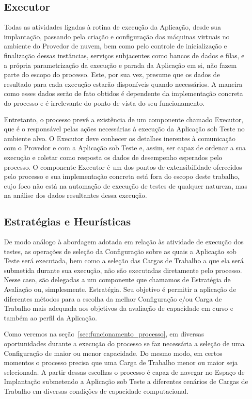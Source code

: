 \subsection{Executor}
Todas as atividades ligadas à rotina de execução da Aplicação, desde sua implantação,
passando pela criação e configuração das máquinas virtuais no ambiente do Provedor 
de nuvem, bem como pelo controle de inicialização e finalização dessas instâncias, 
serviços subjacentes como bancos de dados e filas, e a própria parametrização da 
execução e parada da Aplicação em si, não fazem parte do escopo do processo. Este,
por sua vez, presume que os dados de resultado para cada execução estarão disponíveis
quando necessários. A maneira como esses dados serão de fato obtidos é dependente
da implementação concreta do processo e é irrelevante do ponto de vista do seu 
funcionamento.  

Entretanto, o processo prevê a existência de um componente chamado Executor, que é 
o responsável pelas ações necessárias à execução da Aplicação sob Teste no ambiente
alvo. O Executor deve conhecer os detalhes inerentes à comunicação com o Provedor 
e com a Aplicação sob Teste e, assim, ser capaz de ordenar a sua execução e coletar
como resposta os dados de desempenho esperados pelo processo. O componente Executor
é um dos pontos de extensibilidade oferecidos pelo processo e sua implementação
concreta está fora do escopo deste trabalho, cujo foco não está na automação de
execução de testes de qualquer natureza, mas na análise dos dados resultantes dessa 
execução.

\subsection{Estratégias e Heurísticas}
\label{sec:heuristicas}
De modo análogo à abordagem adotada em relação às atividade de execução dos testes, 
as operações de seleção da Configuração sobre as quais a Aplicação
sob Teste será executada, bem como a seleção das Cargas de Trabalho a que ela 
será submetida durante sua execução, não são executadas diretamente pelo processo.
Nesse caso, são delegadas a um componente que chamamos de Estratégia de Avaliação ou, 
simplesmente, Estratégia. Seu objetivo é permitir a aplicação de diferentes métodos 
para a escolha da melhor Configuração e/ou Carga de Trabalho mais adequada aos 
objetivos da avaliação de capacidade em curso e também ao perfil da Aplicação.

Como veremos na seção~\ref{sec:funcionamento_processo}, em diversas oportunidades
durante a execução do processo se faz necessária a seleção de uma Configuração de
maior ou menor capacidade. Do mesmo modo, em certos momentos o processo precisa
que uma Carga de Trabalho menor ou maior seja selecionada. A partir dessas escolhas
o processo é capaz de navegar no Espaço de Implantação submetendo a Aplicação sob
Teste a diferentes cenários de Cargas de Trabalho em diversas condições de capacidade
computacional.

